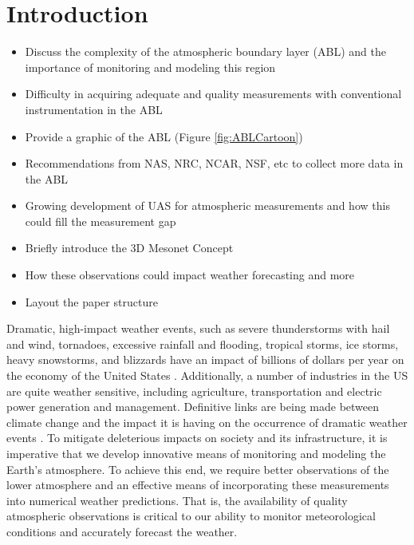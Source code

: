 \documentclass[sensors,review,submit,moreauthors,pdftex,10pt,a4paper]{mdpi}
\theoremstyle{mdpi}
\newcounter{ex}
\newcounter{re}
\theoremstyle{mdpidefinition}
\begin{document}


\section{Introduction}
\begin{itemize}[leftmargin=*,labelsep=4mm]
\color{blue}
\item	Discuss the complexity of the atmospheric boundary layer (ABL) and the importance of monitoring and modeling this region
\item	Difficulty in acquiring adequate and quality measurements with conventional instrumentation in the ABL
\item	Provide a graphic of the ABL (Figure \ref{fig:ABLCartoon})
\item	Recommendations from NAS, NRC, NCAR, NSF, etc to collect more data in the ABL
\item	Growing development of UAS for atmospheric measurements and how this could fill the measurement gap
\item	Briefly introduce the 3D Mesonet Concept
\item	How these observations could impact weather forecasting and more
\item	Layout the paper structure
\end{itemize}

Dramatic, high-impact weather events, such as severe thunderstorms with hail and wind, tornadoes, excessive rainfall and flooding, tropical storms, ice storms, heavy snowstorms, and blizzards have an impact of billions of dollars per year on the economy of the United States \citep{lazo++2011_BAMS, bloesch+2015_EconPerspectives}. Additionally, a number of industries in the US are quite weather sensitive, including agriculture, transportation and electric power generation and management. Definitive links are being made between climate change and the impact it is having on the occurrence of dramatic weather events \citep{wmo2018}. To mitigate deleterious impacts on society and its infrastructure, it is imperative that we develop innovative means of monitoring and modeling the Earth's atmosphere. To achieve this end, we require better observations of the lower atmosphere and an effective means of incorporating these measurements into numerical weather predictions. That  is, the availability of quality atmospheric observations is critical to our ability to monitor meteorological conditions and accurately forecast the weather.
\end{document}
